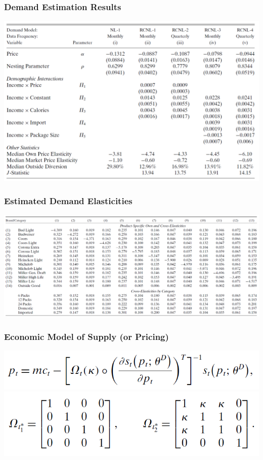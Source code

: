 \documentclass{beamer}
\begin{document}
\begin{frame}\frametitle{Demand Estimation Results}
    \centering
    \includegraphics[width=0.95\linewidth]{table_4}
\end{frame}

\begin{frame}\frametitle{Estimated Demand Elasticities}
    \centering
    \includegraphics[width=0.95\linewidth]{table_5}
\end{frame}

\begin{frame}\frametitle{Economic Model of Supply (or Pricing)}
    \centering
    \includegraphics[width=0.6\linewidth]{eq_9} \\
    \vspace{4ex}
    \includegraphics[width=0.6\linewidth]{eq_10}
\end{frame}
\end{document}
